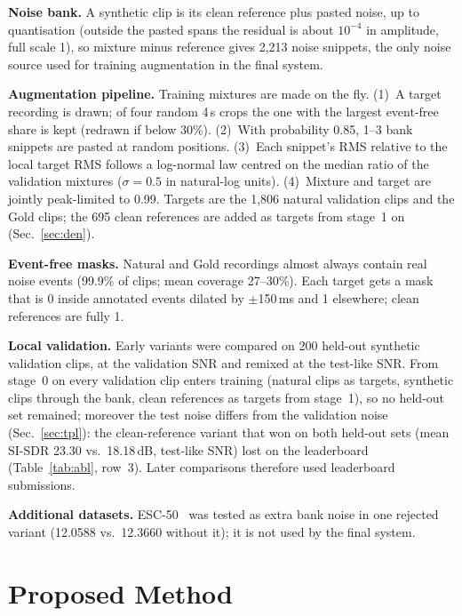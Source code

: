 \documentclass[conference]{IEEEtran}
\begin{document}
\textbf{Noise bank.} A synthetic clip is its clean reference plus pasted noise, up to quantisation (outside the
pasted spans the residual is about $10^{-4}$ in amplitude, full scale 1), so mixture minus reference gives 2,213
noise snippets, the only noise source used for training augmentation in the final system.

\textbf{Augmentation pipeline.} Training mixtures are made on the fly. (1)~A target recording is drawn; of four random
4\,s crops the one with the largest event-free share is kept (redrawn if below 30\%). (2)~With probability 0.85,
1--3 bank snippets are pasted at random positions. (3)~Each snippet's RMS relative to the local target RMS follows a
log-normal law centred on the median ratio of the validation mixtures ($\sigma=0.5$ in natural-log units).
(4)~Mixture and target are jointly peak-limited to 0.99. Targets are the 1,806 natural validation clips and the Gold
clips; the 695 clean references are added as targets from stage~1 on (Sec.~\ref{sec:den}).

\textbf{Event-free masks.} Natural and Gold recordings almost always contain real noise events (99.9\% of clips; mean
coverage 27--30\%). Each target gets a mask that is 0 inside annotated events dilated by $\pm$150\,ms and 1
elsewhere; clean references are fully 1.

\textbf{Local validation.} Early variants were compared on 200 held-out synthetic validation clips, at the validation
SNR and remixed at the test-like SNR. From stage~0 on every validation clip enters training (natural clips as
targets, synthetic clips through the bank, clean references as targets from stage~1), so no held-out set remained;
moreover the test noise differs from the validation noise (Sec.~\ref{sec:tpl}): the clean-reference variant that won
on both held-out sets (mean SI\nobreakdash-SDR 23.30 vs.\ 18.18\,dB, test-like SNR) lost on the leaderboard
(Table~\ref{tab:abl}, row~3). Later comparisons therefore used leaderboard submissions.

\textbf{Additional datasets.} ESC-50~\cite{esc50} was tested as extra bank noise in one rejected variant (12.0588
vs.\ 12.3660 without it); it is not used by the final system.

\section{Proposed Method}
\end{document}
